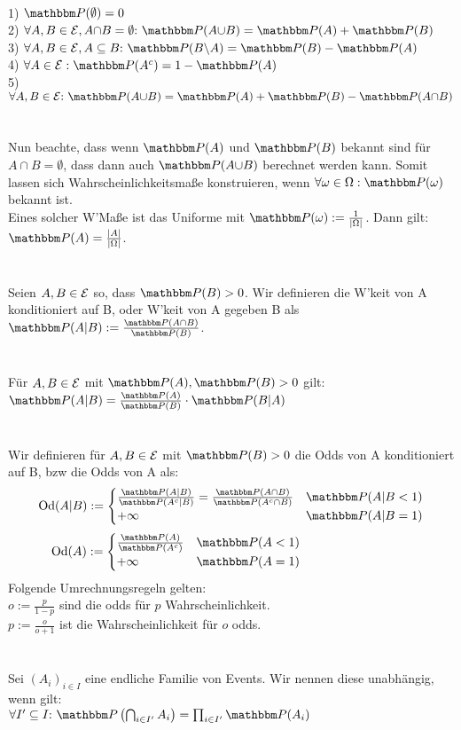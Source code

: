  \\
1) \(\Pro(\emptyset) = 0\) \\
2) \(\forall A,B \in \E, A{\cap} B = \emptyset\QDp \Pro(A{\cup} B) = \Pro(A) + \Pro(B)\) \\
3) \(\forall A,B \in \E, A \subseteq B\QDp \Pro(B{\setminus} A) = \Pro(B) - \Pro(A)\) \\
4) \(\forall A \in \E: \Pro(A^c) = 1-\Pro(A)\) \\
5) \(\forall A,B \in \E \QDp \Pro(A{\cup} B) = \Pro(A) + \Pro(B) - \Pro(A{\cap}B)\) \\ \\
 \\
Nun beachte, dass wenn \(\Pro(A)\) und \(\Pro(B)\) bekannt sind für \(A{\cap}B = \emptyset\), dass dann auch \(\Pro(A{\cup}B)\) berechnet werden kann. Somit lassen sich Wahrscheinlichkeitsmaße konstruieren, wenn \(\forall \omega \in \Omega: \Pro(\omega)\) bekannt ist. \\
Eines solcher W'Maße ist das Uniforme mit \(\Pro(\omega) := \frac{1}{|\Omega|}\). Dann gilt: \(\Pro(A) = \frac{|A|}{|\Omega|}\). \\ \\
 \\
Seien \(A,B \in \mathcal E\) so, dass \(\Pro(B) > 0\). Wir definieren die W'keit von A konditioniert auf B, oder W'keit von A gegeben B als \(\Pro(A{|}B) := \frac{\Pro(A{\cap}B)}{\Pro(B)}\). \\ \\
 \\
Für \(A,B \in \mathcal E\) mit \(\Pro(A), \Pro(B) > 0\) gilt:
\(\Pro(A{|}B) = \frac{\Pro(A)}{\Pro(B)} \cdot \Pro(B{|}A)\) \\ \\
 \\
Wir definieren für \(A,B \in \mathcal E\) mit \(\Pro(B) > 0\) die Odds von A konditioniert auf B, bzw die Odds von A als:
\[\Od(A{|}B) := \begin{cases}
    \frac{\Pro(A{|}B)}{\Pro(A^c{|}B)} = \frac{\Pro(A{\cap}B)}{\Pro(A^c{\cap}B)} & \Pro(A{|}B < 1) \\ +\infty & \Pro(A{|}B = 1)
\end{cases}\]
\[\Od(A) := \begin{cases}
    \frac{\Pro(A)}{\Pro(A^c)} & \Pro(A < 1) \\ +\infty & \Pro(A = 1)
\end{cases} \puffer\puffer\puffer\puffer\puffer\puffer\gap\gap\]
Folgende Umrechnungsregeln gelten: \\
\(o := \frac{p}{1-p}\) sind die odds für \(p\) Wahrscheinlichkeit. \\
\(p := \frac{o}{o+1}\) ist die Wahrscheinlichkeit für \(o\) odds. \\ \\
 \\
Sei \((A_i)_{i \in I}\) eine endliche Familie von Events. Wir nennen diese unabhängig, wenn gilt:\\ \(\forall I'\subseteq I\QDp \Pro\left(\bigcap_{i \in I'}A_i\right) = \prod_{i \in I'}\Pro(A_i)\)
